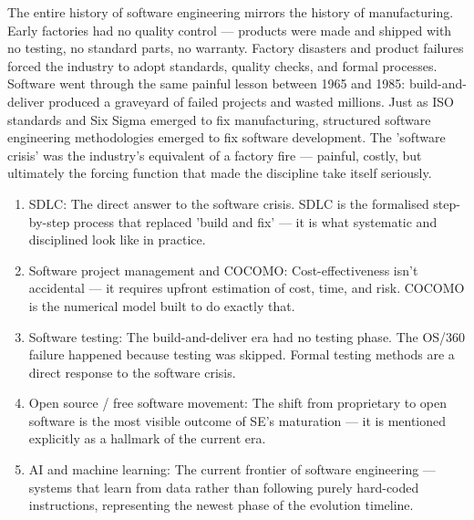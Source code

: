 \documentclass{report}
\begin{document}
\begin{real}
    The entire history of software engineering mirrors the history of manufacturing. Early factories had no quality control — products were made and shipped with no testing, no standard parts, no warranty. Factory disasters and product failures forced the industry to adopt standards, quality checks, and formal processes. Software went through the same painful lesson between 1965 and 1985: build-and-deliver produced a graveyard of failed projects and wasted millions. Just as ISO standards and Six Sigma emerged to fix manufacturing, structured software engineering methodologies emerged to fix software development. The 'software crisis' was the industry's equivalent of a factory fire — painful, costly, but ultimately the forcing function that made the discipline take itself seriously.
\end{real}

\begin{con}
\begin{enumerate}
    \item SDLC: The direct answer to the software crisis. SDLC is the formalised step-by-step process that replaced 'build and fix' — it is what systematic and disciplined look like in practice.
    \item Software project management and COCOMO: Cost-effectiveness isn't accidental — it requires upfront estimation of cost, time, and risk. COCOMO is the numerical model built to do exactly that.
    \item Software testing: The build-and-deliver era had no testing phase. The OS/360 failure happened because testing was skipped. Formal testing methods are a direct response to the software crisis.
    \item Open source / free software movement: The shift from proprietary to open software is the most visible outcome of SE's maturation — it is mentioned explicitly as a hallmark of the current era.
    \item AI and machine learning: The current frontier of software engineering — systems that learn from data rather than following purely hard-coded instructions, representing the newest phase of the evolution timeline.
\end{enumerate}
\end{con}
\end{document}
